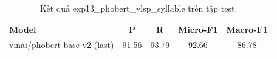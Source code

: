 \begin{table}[t]
\centering
\begin{tabular}{lcccc}
\hline
\textbf{Model} & \textbf{P} & \textbf{R} & \textbf{Micro-F1} & \textbf{Macro-F1} \\
\hline
vinai/phobert-base-v2 (last) & 91.56 & 93.79 & 92.66 & 86.78 \\
\hline
\end{tabular}
\caption{Kết quả exp13_phobert_vlsp_syllable trên tập test.}
\label{tab:main}
\end{table}